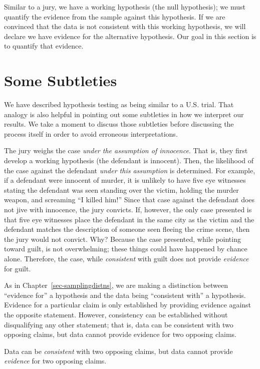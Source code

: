 \documentclass[
  letterpaper,
  DIV=11,
  numbers=noendperiod]{scrreprt}
\theoremstyle{plain}
\theoremstyle{definition}
\theoremstyle{definition}
\theoremstyle{remark}
\begin{document}
Similar to a jury, we have a working hypothesis (the null hypothesis);
we must quantify the evidence from the sample against this hypothesis.
If we are convinced that the data is not consistent with this working
hypothesis, we will declare we have evidence for the alternative
hypothesis. Our goal in this section is to quantify that evidence.

\section{Some Subtleties}\label{some-subtleties}

We have described hypothesis testing as being similar to a U.S. trial.
That analogy is also helpful in pointing out some subtleties in how we
interpret our results. We take a moment to discuss those subtleties
before discussing the process itself in order to avoid erroneous
interpretations.

The jury weighs the case \emph{under the assumption of innocence}. That
is, they first develop a working hypothesis (the defendant is innocent).
Then, the likelihood of the case against the defendant \emph{under this
assumption} is determined. For example, if a defendant were innocent of
murder, it is unlikely to have five eye witnesses stating the defendant
was seen standing over the victim, holding the murder weapon, and
screaming ``I killed him!'' Since that case against the defendant does
not jive with innocence, the jury convicts. If, however, the only case
presented is that five eye witnesses place the defendant in the same
city as the victim and the defendant matches the description of someone
seen fleeing the crime scene, then the jury would not convict. Why?
Because the case presented, while pointing toward guilt, is not
overwhelming; these things could have happened by chance alone.
Therefore, the case, while \emph{consistent} with guilt does not provide
\emph{evidence} for guilt.

As in Chapter~\ref{sec-samplingdistns}, we are making a distinction
between ``evidence for'' a hypothesis and the data being ``consistent
with'' a hypothesis. Evidence for a particular claim is only established
by providing evidence against the opposite statement. However,
consistency can be established without disqualifying any other
statement; that is, data can be consistent with two opposing claims, but
data cannot provide evidence for two opposing claims.

\begin{tcolorbox}[enhanced jigsaw, breakable, titlerule=0mm, colframe=quarto-callout-tip-color-frame, bottomtitle=1mm, opacityback=0, rightrule=.15mm, toptitle=1mm, arc=.35mm, bottomrule=.15mm, left=2mm, title=\textcolor{quarto-callout-tip-color}{\faLightbulb}\hspace{0.5em}{Big Idea}, leftrule=.75mm, coltitle=black, toprule=.15mm, colbacktitle=quarto-callout-tip-color!10!white, colback=white, opacitybacktitle=0.6]

Data can be \emph{consistent} with two opposing claims, but data cannot
provide \emph{evidence} for two opposing claims.

\end{tcolorbox}
\end{document}
